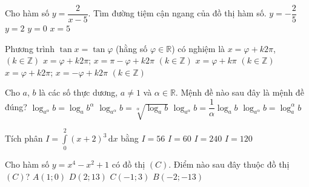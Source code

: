 \begin{ex}%
Cho hàm số $y=\dfrac{2}{x-5}$. Tìm đường tiệm cận ngang của đồ thị hàm số. 
\choice
{$y =-\dfrac{2}{5}$}
{$y=2$}
{\True $y=0$}
{$x=5$}
\end{ex}

\begin{ex}%
Phương trình $\tan x=\tan\varphi$ (hằng số $\varphi\in\mathbb{R}$) có nghiệm là
\choice
{$x=\varphi+k2\pi$, $(k\in\mathbb{Z})$}
{$x=\varphi+k2\pi$; $x=\pi-\varphi+k2\pi$ $(k\in\mathbb{Z})$}
{\True $x=\varphi+k\pi$ $(k\in\mathbb{Z})$}
{$x=\varphi+k2\pi$; $x=-\varphi+k2\pi$ $(k\in\mathbb{Z})$}
\end{ex}

\begin{ex}%
Cho $a$, $b$ là các số thực dương, $a\ne1$ và $\alpha\in\mathbb{R}$. Mệnh đề nào sau đây là mệnh đề đúng?
\choice
{$\log_{a^{\alpha}}b=\log_ab^{\alpha}$}
{$\log_{a^{\alpha}}b=\sqrt[\alpha]{\log_ab}$}
{\True $\log_{a^{\alpha}}b=\dfrac{1}{\alpha}\log_ab$}
{$\log_{a^{\alpha}}b=\log_{a} ^{\alpha}b$}
\end{ex}

\begin{ex}%
Tích phân $I=\displaystyle\int\limits_0^2(x+2)^3\mathrm{\,d}x$ bằng
\choice
{$I=56$}
{\True $I=60$}
{$I=240$}
{$I=120$}
\end{ex}

\begin{ex}%
Cho hàm số $y=x^4-x^2+1$ có đồ thị $(C)$. Điểm nào sau đây thuộc đồ thị $(C)$?
\choice
{$A(1;0)$}
{\True $D(2;13)$}
{$C(-1;3)$}
{$B(-2;-13)$}
\end{ex}

